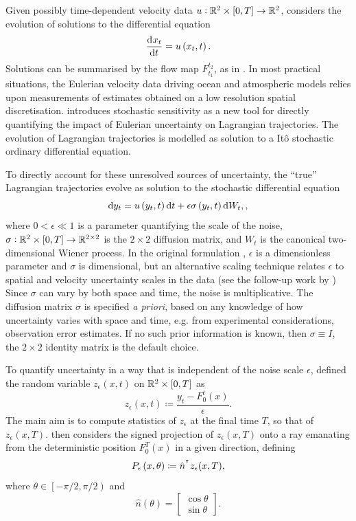 Given possibly time-dependent velocity data \(u: \mathbb{R}^2 \times [0,T] \to \mathbb{R}^2\), \citet{Balasuriya_2020_StochasticSensitivityComputable} considers the evolution of solutions to the differential equation
\[
	\dod{x_t}{t} = u\left(x_t, t\right).
\]
Solutions can be summarised by the flow map \(F_{t_1}^{t_2}\), as in .
In most practical situations, the Eulerian velocity data driving ocean and atmospheric models relies upon measurements of estimates obtained on a low resolution spatial discretisation.
\citet{Balasuriya_2020_StochasticSensitivityComputable} introduces stochastic sensitivity as a new tool for directly quantifying the impact of Eulerian uncertainty on Lagrangian trajectories.
The evolution of Lagrangian trajectories is modelled as solution to a It\^o stochastic ordinary differential equation.

To directly account for these unresolved sources of uncertainty, the ``true'' Lagrangian trajectories evolve as solution to the stochastic differential equation
\begin{equation}
	\sde{y_t}{u\left(y_t, t\right)}{\epsilon\sigma\left(y_t, t\right)},
	\label{eqn:ss_sde},
\end{equation}
where \(0 < \epsilon \ll 1\) is a parameter quantifying the scale of the noise, \(\sigma:	\mathbb{R}^2\times[0,T] \to \mathbb{R}^{2\times 2}\) is the \(2\times 2\) diffusion matrix, and \(W_t\) is the canonical two-dimensional Wiener process.
In the original formulation \citep{Balasuriya_2020_StochasticSensitivityComputable}, \(\epsilon\) is a dimensionless parameter and \(\sigma\) is dimensional, but an alternative scaling technique relates \(\epsilon\) to spatial and velocity uncertainty scales in the data (see the follow-up work by \citet{BadzaEtAl_2023_HowSensitiveAre,Balasuriya_2020_UncertaintyFinitetimeLyapunov,FangEtAl_2020_DisentanglingResolutionPrecision})
Since \(\sigma\) can vary by both space and time, the noise is multiplicative.
The diffusion matrix \(\sigma\) is specified \emph{a priori}, based on any knowledge of how uncertainty varies with space and time, e.g. from experimental considerations, observation error estimates.
If no such prior information is known, then \(\sigma \equiv I\), the \(2 \times 2\) identity matrix is the default choice.

To quantify uncertainty in a way that is independent of the noise scale \(\epsilon\), \citet{Balasuriya_2020_StochasticSensitivityComputable} defined the random variable \(z_\epsilon\left(x,t\right)\) on \(\mathbb{R}^2 \times [0,T]\) as
\[
	z_\epsilon\left(x,t\right) \coloneqq \frac{y_t - F_0^t(x)}{\epsilon}.
\]
The main aim is to compute statistics of \(z_\epsilon\) at the final time \(T\), so that of \(z_\epsilon\left(x,T\right)\).
\citet{Balasuriya_2020_StochasticSensitivityComputable} then considers the signed projection of \(z_\epsilon\left(x,T\right)\) onto a ray emanating from the deterministic position \(F_0^T(x)\) in a given direction, defining
\[
	P_\epsilon\left(x,\theta\right) \coloneqq \hat{n}^{^{\intercal}} z_\epsilon(x,T),
\]
where \(\theta \in \left[-\pi/2, \pi/2\right)\) and
\[
	\hat{n}(\theta) = \begin{bmatrix}
		\cos{\theta} \\
		\sin{\theta}
	\end{bmatrix}.
\]

